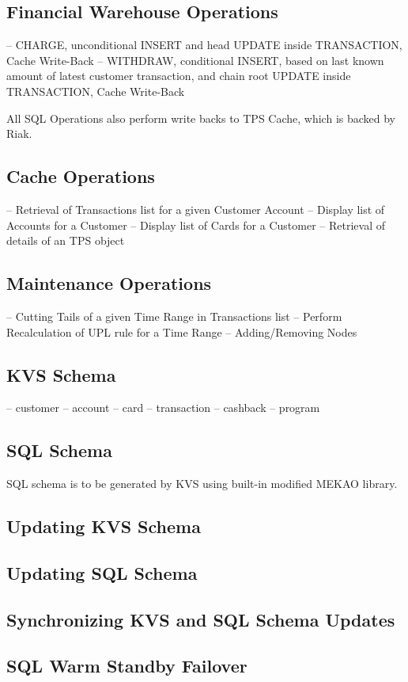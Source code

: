 \subsection{Financial Warehouse Operations}

-- CHARGE, unconditional INSERT and head UPDATE inside TRANSACTION, Cache Write-Back
-- WITHDRAW, conditional INSERT, based on last known amount of latest customer transaction, and chain root UPDATE inside TRANSACTION, Cache Write-Back

All SQL Operations also perform write backs to TPS Cache, which is backed by Riak.

\subsection{Cache Operations}

-- Retrieval of Transactions list for a given Customer Account
-- Display list of Accounts for a Customer
-- Display list of Cards for a Customer
-- Retrieval of details of an TPS object

\subsection{Maintenance Operations}

-- Cutting Tails of a given Time Range in Transactions list
-- Perform Recalculation of UPL rule for a Time Range
-- Adding/Removing Nodes

\subsection{KVS Schema}

-- customer
-- account
-- card
-- transaction
-- cashback
-- program

\subsection{SQL Schema}

SQL schema is to be generated by KVS using built-in modified MEKAO library.

\subsection{Updating KVS Schema}

\subsection{Updating SQL Schema}

\subsection{Synchronizing KVS and SQL Schema Updates}

\subsection{SQL Warm Standby Failover}
